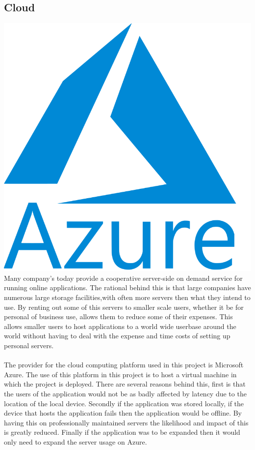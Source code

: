 \subsection{Cloud}
\includegraphics[scale=0.15]{./img/Azure.PNG}
Many company's today provide a cooperative server-side on demand service for running online applications.  The rational behind this is that large companies have numerous large storage facilities,with often more servers then what they intend to use. By renting out some of this servers to smaller scale users, whether it be for personal of business use, allows them to reduce some of their expenses.  This allows smaller users to host applications to a world wide userbase around the world without having to deal with the expense and time costs of setting up personal servers.\\\\
The provider for the cloud computing platform used in this project is Microsoft Azure.  The use of this platform in this project is to host a virtual machine in which the project is deployed. There are several reasons behind this, first is that the users of the application would not be as badly affected by latency due to the location of the local device.  Secondly if the application was stored locally, if the device that hosts the application fails then the application would be offline. By having this on professionally maintained servers the likelihood and impact of this is greatly reduced. Finally if the application was to be expanded then it would only need to expand the server usage on Azure.

